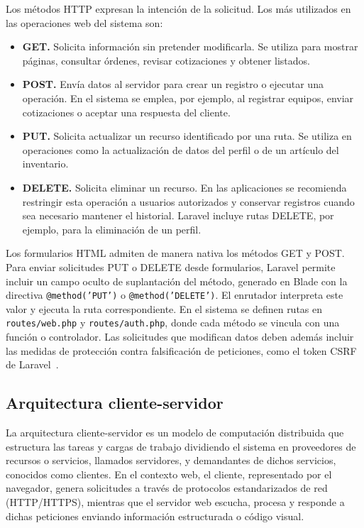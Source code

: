 Los métodos HTTP expresan la intención de la solicitud. Los más utilizados en las operaciones web del sistema son:

\begin{itemize}
    \item \textbf{GET.} Solicita información sin pretender modificarla. Se utiliza para mostrar páginas, consultar órdenes, revisar cotizaciones y obtener listados.
    \item \textbf{POST.} Envía datos al servidor para crear un registro o ejecutar una operación. En el sistema se emplea, por ejemplo, al registrar equipos, enviar cotizaciones o aceptar una respuesta del cliente.
    \item \textbf{PUT.} Solicita actualizar un recurso identificado por una ruta. Se utiliza en operaciones como la actualización de datos del perfil o de un artículo del inventario.
    \item \textbf{DELETE.} Solicita eliminar un recurso. En las aplicaciones se recomienda restringir esta operación a usuarios autorizados y conservar registros cuando sea necesario mantener el historial. Laravel incluye rutas DELETE, por ejemplo, para la eliminación de un perfil.
\end{itemize}

Los formularios HTML admiten de manera nativa los métodos GET y POST. Para enviar solicitudes PUT o DELETE desde formularios, Laravel permite incluir un campo oculto de suplantación del método, generado en Blade con la directiva \texttt{@method('PUT')} o \texttt{@method('DELETE')}. El enrutador interpreta este valor y ejecuta la ruta correspondiente. En el sistema se definen rutas en \texttt{routes/web.php} y \texttt{routes/auth.php}, donde cada método se vincula con una función o controlador. Las solicitudes que modifican datos deben además incluir las medidas de protección contra falsificación de peticiones, como el token CSRF de Laravel~\cite{mdn_web_dev, laravel_doc}.

\subsection{Arquitectura cliente-servidor}

La arquitectura cliente-servidor es un modelo de computación distribuida que estructura las tareas y cargas de trabajo dividiendo el sistema en proveedores de recursos o servicios, llamados servidores, y demandantes de dichos servicios, conocidos como clientes. En el contexto web, el cliente, representado por el navegador, genera solicitudes a través de protocolos estandarizados de red (HTTP/HTTPS), mientras que el servidor web escucha, procesa y responde a dichas peticiones enviando información estructurada o código visual.

